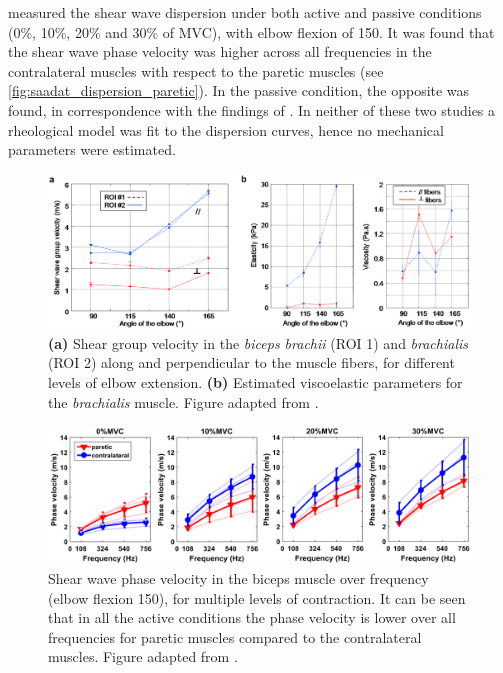 \citet{saadat_frequency_2018} measured the shear wave dispersion under both active and passive conditions (0\%, 10\%, 20\% and 30\% of MVC), with elbow flexion of \SI{150}{\deg}. It was found that the shear wave phase velocity was higher across all frequencies in the contralateral muscles with respect to the paretic muscles (see \autoref{fig:saadat_dispersion_paretic}). In the passive condition, the opposite was found, in correspondence with the findings of \citeauthor{rasool_altered_2016} \cite{saadat_frequency_2018}. In neither of these two studies a rheological model was fit to the dispersion curves, hence no mechanical parameters were estimated. 





\begin{figure}[t]
	\centering
	\includegraphics[width=.95\linewidth]{Figures/elastography/gennisson_dispersion_passive.png}
	\caption{\textbf{(a)} Shear group velocity in the  \textit{biceps brachii} (ROI 1) and \textit{brachialis} (ROI 2) along and perpendicular to the muscle fibers, for different levels of elbow extension. \textbf{(b)} Estimated viscoelastic parameters for the \textit{brachialis} muscle. Figure adapted from \citet{gennisson_viscoelastic_2010}.}
	\label{fig:rem_gennisson_dispersion_passive}
\end{figure}

\begin{figure}[t]
	\centering
	\includegraphics[width=.95\linewidth]{Figures/elastography/saadat_dispersion_paretic.png}
	\caption{Shear wave phase velocity in the biceps muscle over frequency (elbow flexion \SI{150}{\deg}), for multiple levels of contraction. It can be seen that in all the active conditions the phase velocity is lower over all frequencies for paretic muscles compared to the contralateral muscles. Figure adapted from \citet{saadat_frequency_2018}.}
	\label{fig:saadat_dispersion_paretic}
\end{figure}


